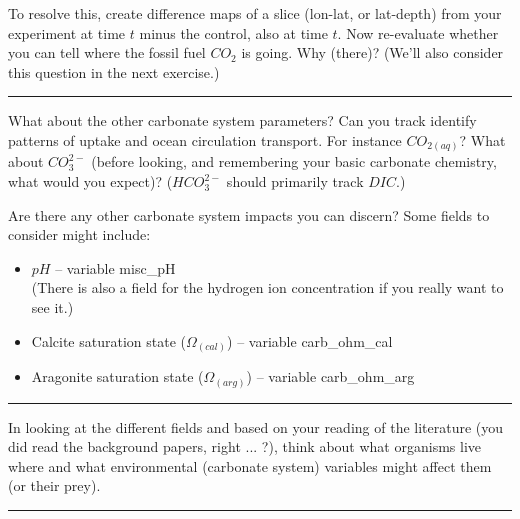 To resolve this, create difference maps of a slice (lon-lat, or lat-depth) from your experiment at time \(t\) minus the control, also at time \(t\). Now re-evaluate whether you can tell where the fossil fuel \(CO_{2}\) is going. Why (there)? (We'll also consider this question in the next exercise.)

\vspace{1mm} \noindent\rule{4cm}{0.1mm} \vspace{2mm}

\noindent What about the other carbonate system parameters? Can you track identify patterns of uptake and ocean circulation transport. For instance \(CO_{2(aq)}\)? What about \(CO^{2-}_{3}\) (before looking, and remembering your basic carbonate chemistry, what would you expect)? (\(HCO^{2-}_{3}\) should primarily track \(DIC\).)

Are there any other carbonate system impacts you can discern? Some fields to consider might include:

\vspace{1mm}
\begin{itemize}[noitemsep]
\item \(pH\) -- variable \textsf{\footnotesize misc\_pH} 
\\(There is also a field for the hydrogen ion concentration if you really want to see it.)
\item Calcite saturation state (\(\Omega_{(cal)}\)) -- variable \textsf{\footnotesize carb\_ohm\_cal}
\item Aragonite saturation state (\(\Omega_{(arg)}\)) -- variable \textsf{\footnotesize carb\_ohm\_arg} 
\end{itemize}

\vspace{1mm} \noindent\rule{4cm}{0.1mm} \vspace{2mm}

\noindent In looking at the different fields and based on your reading of the literature (you did read the background papers, right ... ?), think about what organisms live where and what environmental (carbonate system) variables might affect them (or their prey).

\vspace{1mm} \noindent\rule{4cm}{0.1mm} \vspace{2mm}

